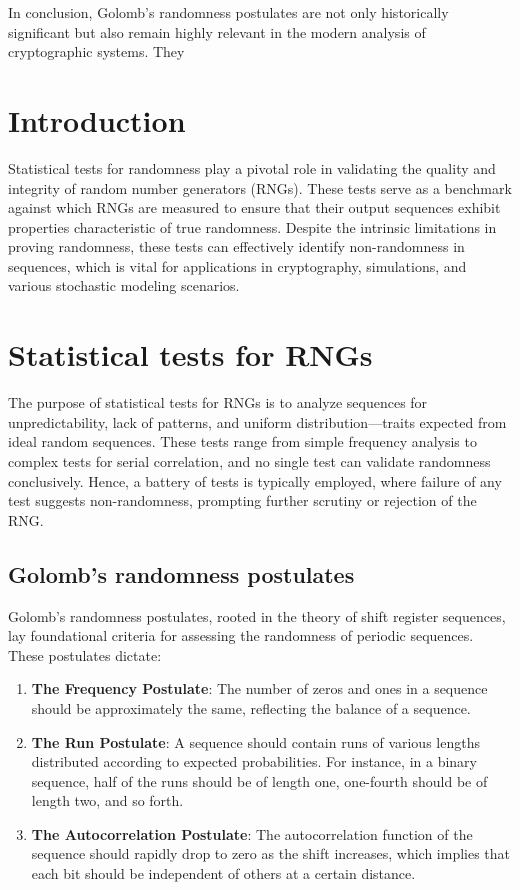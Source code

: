 \documentclass[12pt,openany]{book}
\theoremstyle{definition}
\begin{document}
In conclusion, Golomb’s randomness postulates are not only historically significant but also remain highly relevant in the modern analysis of cryptographic systems. They


\section{Introduction}
Statistical tests for randomness play a pivotal role in validating the quality and integrity of random number generators (RNGs). These tests serve as a benchmark against which RNGs are measured to ensure that their output sequences exhibit properties characteristic of true randomness. Despite the intrinsic limitations in proving randomness, these tests can effectively identify non-randomness in sequences, which is vital for applications in cryptography, simulations, and various stochastic modeling scenarios.

\section{Statistical tests for RNGs}
The purpose of statistical tests for RNGs is to analyze sequences for unpredictability, lack of patterns, and uniform distribution—traits expected from ideal random sequences. These tests range from simple frequency analysis to complex tests for serial correlation, and no single test can validate randomness conclusively. Hence, a battery of tests is typically employed, where failure of any test suggests non-randomness, prompting further scrutiny or rejection of the RNG.

\subsection{Golomb’s randomness postulates}
Golomb's randomness postulates, rooted in the theory of shift register sequences, lay foundational criteria for assessing the randomness of periodic sequences. These postulates dictate:

\begin{enumerate}
	\item \textbf{The Frequency Postulate}: The number of zeros and ones in a sequence should be approximately the same, reflecting the balance of a sequence.
	\item \textbf{The Run Postulate}: A sequence should contain runs of various lengths distributed according to expected probabilities. For instance, in a binary sequence, half of the runs should be of length one, one-fourth should be of length two, and so forth.
	\item \textbf{The Autocorrelation Postulate}: The autocorrelation function of the sequence should rapidly drop to zero as the shift increases, which implies that each bit should be independent of others at a certain distance.
\end{enumerate}
\end{document}
